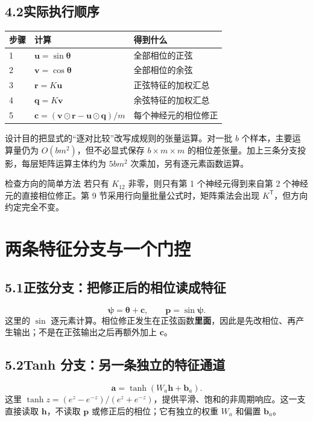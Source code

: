 \documentclass[UTF8,11pt,a4paper,fontset=fandol]{ctexart}
\newcommand{\purpose}[1]{\begin{explain}{设计目的}#1\end{explain}}
\newcommand{\newsection}[1]{\clearpage\section{#1}}
\begin{document}
\subsection*{4.2\quad 实际执行顺序}
\par\smallskip\noindent\begin{tabularx}{\linewidth}{@{}p{12mm}p{58mm}Y@{}}
\toprule
步骤&计算&得到什么\\&$\boldsymbol{u}=\sin\boldsymbol{\theta}$&全部相位的正弦\\
2&$\boldsymbol{v}=\cos\boldsymbol{\theta}$&全部相位的余弦\\
3&$\boldsymbol{r}=K\boldsymbol{u}$&正弦特征的加权汇总\\
4&$\boldsymbol{q}=K\boldsymbol{v}$&余弦特征的加权汇总\\
5&$\boldsymbol{c}=(\boldsymbol{v}\odot\boldsymbol{r}-\boldsymbol{u}\odot\boldsymbol{q})/m$&每个神经元的相位修正\\\bottomrule
\end{tabularx}\par\smallskip
\purpose{把显式的“逐对比较”改写成规则的张量运算。对一批 $b$ 个样本，主要运算量仍为 $O(bm^2)$，但不必显式保存 $b\times m\times m$ 的相位差张量。加上三条分支投影，每层矩阵运算主体约为 $5bm^2$ 次乘加，另有逐元素函数运算。}
\begin{notebox}{检查方向的简单方法}
若只有 $K_{12}$ 非零，则只有第 1 个神经元得到来自第 2 个神经元的直接相位修正。第 9 节采用行向量批量公式时，矩阵乘法会出现 $K^{\mathsf T}$，但方向约定完全不变。
\end{notebox}

\newsection{两条特征分支与一个门控}
\subsection*{5.1\quad 正弦分支：把修正后的相位读成特征}
\begin{equation}\label{eq:p}
\boldsymbol{\psi}=\boldsymbol{\theta}+\boldsymbol{c},\qquad
\boxed{\boldsymbol{p}=\sin\boldsymbol{\psi}.}
\end{equation}
这里的 $\sin$ 逐元素计算。相位修正发生在正弦函数\textbf{里面}，因此是先改相位、再产生输出；不是在正弦输出之后再额外加上 $\boldsymbol{c}$。
\subsection*{5.2\quad Tanh 分支：另一条独立的特征通道}
\begin{equation}\label{eq:a}
\boxed{\boldsymbol{a}=\tanh(W_a\boldsymbol{h}+\boldsymbol{b}_a).}
\end{equation}
这里 $\tanh z=(e^z-e^{-z})/(e^z+e^{-z})$，提供平滑、饱和的非周期响应。这一支直接读取 $\boldsymbol{h}$，不读取 $\boldsymbol{p}$ 或修正后的相位；它有独立的权重 $W_a$ 和偏置 $\boldsymbol{b}_a$。
\end{document}
